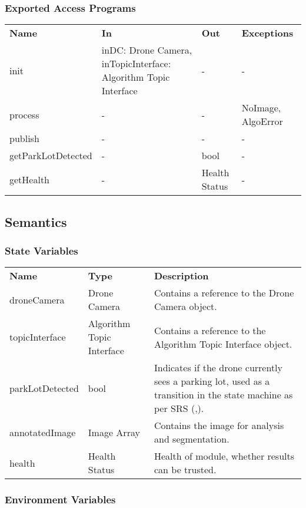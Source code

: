 \documentclass[12pt, titlepage]{article}
\begin{document}
\subsubsection{Exported Access Programs}
\begin{center}
\begin{tabular}{p{3.5cm} p{5cm} p{2.5cm} p{2.5cm}}
\hline
\textbf{Name} & \textbf{In} & \textbf{Out} & \textbf{Exceptions} \\
init & inDC: Drone Camera, inTopicInterface: Algorithm Topic Interface & - & - \\
process & - & - & NoImage, AlgoError \\
publish & - & - & - \\
getParkLotDetected & - & bool & - \\
getHealth & - & Health Status & - \\
\hline
\hline
\end{tabular}
\end{center}
\subsection{Semantics}
\subsubsection{State Variables}
\begin{center}
\begin{tabular}{p{3 cm} p{4cm} p{5cm} }
\hline
\textbf{Name} & \textbf{Type} & \textbf{Description}  \\
droneCamera & Drone Camera & Contains a reference to the Drone Camera object. \\
topicInterface & Algorithm Topic Interface & Contains a reference to the Algorithm Topic Interface object.\\
parkLotDetected & bool & Indicates if the drone currently sees a parking lot, used as a transition in the state machine as per SRS (\nameref{TRANS_007},\nameref{TRANS_008}). \\
annotatedImage & Image Array & Contains the image for analysis and segmentation.   \\
health & Health Status & Health of module, whether results can be trusted.   \\
\hline
\hline
\end{tabular}
\end{center}
\subsubsection{Environment Variables}
\end{document}
